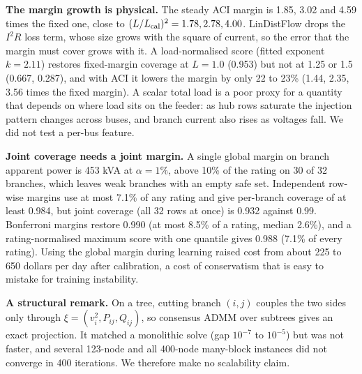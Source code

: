 \documentclass[11pt]{article}
\begin{document}
\textbf{The margin growth is physical.} The steady ACI margin is 1.85, 3.02 and 4.59 times the fixed one, close to $(L/L_{\rm cal})^2=1.78,2.78,4.00$. LinDistFlow drops the $I^2R$ loss term, whose size grows with the square of current, so the error that the margin must cover grows with it. A load-normalised score (fitted exponent $k=2.11$) restores fixed-margin coverage at $L=1.0$ (0.953) but not at 1.25 or 1.5 (0.667, 0.287), and with ACI it lowers the margin by only 22 to 23\% (1.44, 2.35, 3.56 times the fixed margin). A scalar total load is a poor proxy for a quantity that depends on where load sits on the feeder: as hub rows saturate the injection pattern changes across buses, and branch current also rises as voltages fall. We did not test a per-bus feature.

\textbf{Joint coverage needs a joint margin.} A single global margin on branch apparent power is 453 kVA at $\alpha=1\%$, above 10\% of the rating on 30 of 32 branches, which leaves weak branches with an empty safe set. Independent row-wise margins use at most 7.1\% of any rating and give per-branch coverage of at least 0.984, but joint coverage (all 32 rows at once) is 0.932 against 0.99. Bonferroni margins restore 0.990 (at most 8.5\% of a rating, median 2.6\%), and a rating-normalised maximum score with one quantile gives 0.988 (7.1\% of every rating). Using the global margin during learning raised cost from about 225 to 650 dollars per day after calibration, a cost of conservatism that is easy to mistake for training instability.

\textbf{A structural remark.} On a tree, cutting branch $(i,j)$ couples the two sides only through $\xi=(v_i^2,P_{ij},Q_{ij})$, so consensus ADMM over subtrees gives an exact projection. It matched a monolithic solve (gap $10^{-7}$ to $10^{-5}$) but was not faster, and several 123-node and all 400-node many-block instances did not converge in 400 iterations. We therefore make no scalability claim.
\end{document}
